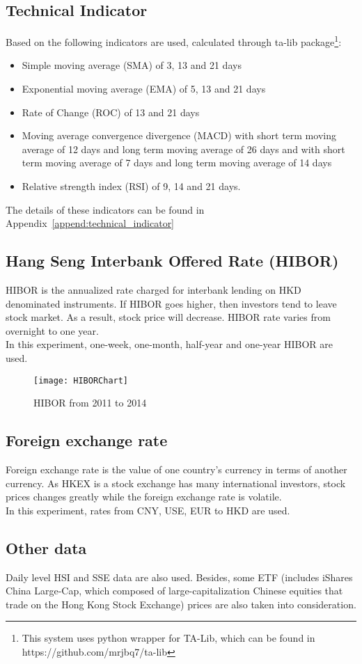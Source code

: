 \subsection{Technical Indicator}

Based on \cite{lauretto2013evaluation} the following indicators are used, calculated through ta-lib package\footnote{This system uses python wrapper for TA-Lib, which can be found in https://github.com/mrjbq7/ta-lib}:
\begin{itemize}
	\item Simple moving average (SMA) of 3, 13 and 21 days
	\item Exponential moving average (EMA) of 5, 13 and 21 days
	\item Rate of Change (ROC) of 13 and 21 days
	\item Moving average convergence divergence (MACD) with short term moving average of 12 days and long term moving average of 26 days and with short term moving average of 7 days and long term moving average of 14 days
	\item Relative strength index (RSI) of 9, 14 and 21 days.
\end{itemize}

The details of these indicators can be found in Appendix~\ref{append:technical_indicator}

\subsection{Hang Seng Interbank Offered Rate (HIBOR)}
HIBOR is the annualized rate charged for interbank lending on HKD denominated instruments\cite{chen2010principal}. If HIBOR goes higher, then investors tend to leave stock market. As a result, stock price will decrease. HIBOR rate varies from overnight to one year. \\

In this experiment, one-week, one-month, half-year and one-year HIBOR are used. 

\begin{figure}[h]
	\centering
	\texttt{[image: HIBORChart]}
	\caption{HIBOR from 2011 to 2014}
\end{figure}



\subsection{Foreign exchange rate}
Foreign exchange rate is the value of one country’s currency in terms of another currency. As HKEX is a stock exchange has many international investors, stock prices changes greatly while the foreign exchange rate is volatile.\\


In this experiment, rates from CNY, USE, EUR to HKD are used.

\subsection{Other data}
Daily level HSI and SSE data are also used. Besides, some ETF (includes iShares China Large-Cap, which composed of large-capitalization Chinese equities that trade on the Hong Kong Stock Exchange) prices are also taken into consideration.
